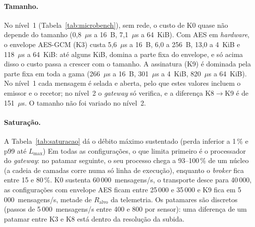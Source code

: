 \paragraph{Tamanho.} No nível~1 (Tabela~\ref{tab:microbench}), sem rede, o custo de
K0 quase não depende do tamanho (0,8~$\mu$s a 16~B, 7,1~$\mu$s a 64~KiB). Com AES
em \emph{hardware}, o envelope AES-GCM (K3) custa 5,6~$\mu$s a 16~B, 6,0 a 256~B,
13,0 a 4~KiB e 118~$\mu$s a 64~KiB: até alguns KiB, domina a parte fixa do
envelope, e só acima disso o custo passa a crescer com o tamanho. A assinatura
(K9) é dominada pela parte fixa em toda a gama (266~$\mu$s a 16~B, 301~$\mu$s a
4~KiB, 820~$\mu$s a 64~KiB). No nível~1 cada mensagem é selada e aberta, pelo que
estes valores incluem o emissor e o recetor; no nível~2 o \emph{gateway} só
verifica, e a diferença K8$\to$K9 é de 151~$\mu$s. O tamanho não foi variado no
nível~2.

\paragraph{Saturação.} A Tabela~\ref{tab:saturacao} dá o débito máximo sustentado
(perda inferior a 1\,\% e p99 até $L_{\max}$) Em todas as configurações, o que limita primeiro é o processador do
\emph{gateway}: no patamar seguinte, o seu processo chega a 93--100\,\% de um núcleo
(a cadeia de camadas corre numa só linha de execução), enquanto o \emph{broker}
fica entre 15 e 80\,\%. K0 sustenta 60\,000~mensagens/s, o transporte desce para
40\,000, as configurações com envelope AES ficam entre 25\,000 e 35\,000 e K9 fica
em 5\,000~mensagens/s, metade de $R_{\text{alvo}}$ da telemetria. Os patamares são
discretos (passos de 5\,000~mensagens/s entre 400 e 800 por sensor): uma
diferença de um patamar entre K3 e K8 está dentro da resolução da subida.  



